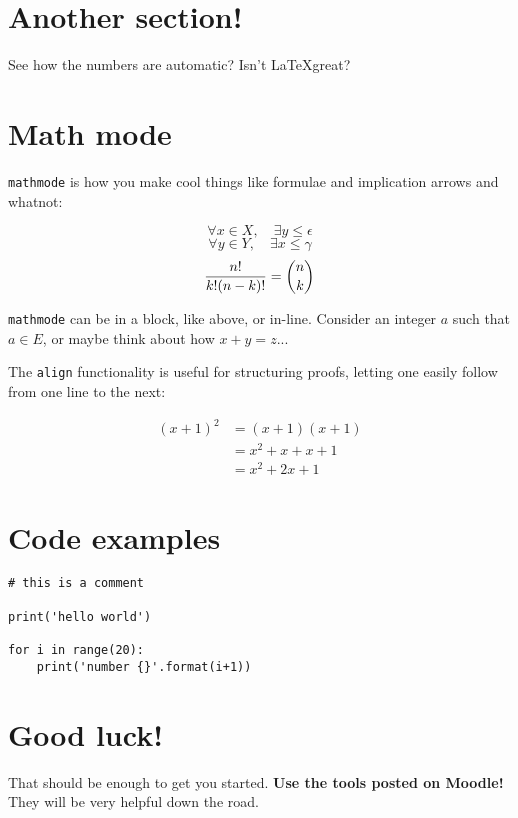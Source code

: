 \documentclass{article}
\begin{document}
\section{Another section!}

See how the numbers are automatic? Isn't \LaTeX great?

\section{Math mode}

\texttt{mathmode} is how you make cool things like formulae and implication arrows and whatnot:

$$\forall x \in X, \quad \exists y \leq \epsilon$$
$$\forall y \in Y, \quad \exists x \leq \gamma$$
$${n! \over k!(n-k)!} = {n \choose k}$$

\texttt{mathmode} can be in a block, like above, or in-line. Consider an integer $a$ such that $a \in E$, or maybe think about how $x + y = z$...

\newpage

\noindent
The \texttt{align} functionality is useful for structuring proofs, letting one easily follow from one line to the next:

\begin{align}
	(x+1)^2 &= (x+1)(x+1) \\
		&= x^2 + x + x + 1 \\
		&= x^2 + 2x + 1
\end{align}

\section{Code examples}

\lstset{language=Python, 
        basicstyle=\ttfamily\small, 
        showstringspaces=false,
	numbers=left,
	frame=single,
	tabsize=4,
	commentstyle=,
}
\begin{lstlisting}
# this is a comment

print('hello world')

for i in range(20):
	print('number {}'.format(i+1))
\end{lstlisting}

\section{Good luck!}

That should be enough to get you started. \textbf{Use the tools posted on Moodle!} They will be very helpful down the road.
\end{document}
